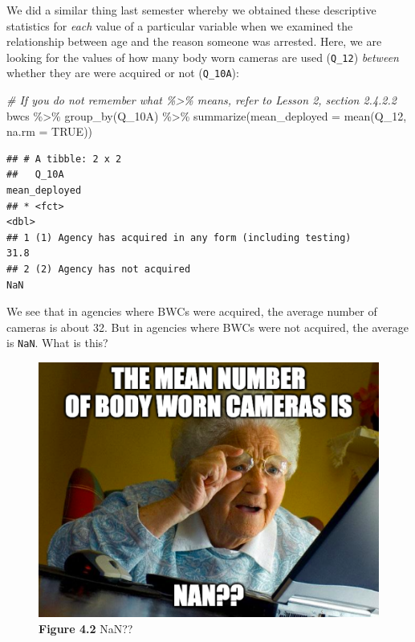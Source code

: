 \documentclass[
]{book}
\newenvironment{Shaded}{\begin{snugshade}}{\end{snugshade}}
\newcommand{\AttributeTok}[1]{\textcolor[rgb]{0.77,0.63,0.00}{#1}}
\newcommand{\CommentTok}[1]{\textcolor[rgb]{0.56,0.35,0.01}{\textit{#1}}}
\newcommand{\ConstantTok}[1]{\textcolor[rgb]{0.00,0.00,0.00}{#1}}
\newcommand{\FunctionTok}[1]{\textcolor[rgb]{0.00,0.00,0.00}{#1}}
\newcommand{\NormalTok}[1]{#1}
\newcommand{\SpecialCharTok}[1]{\textcolor[rgb]{0.00,0.00,0.00}{#1}}
\begin{document}
We did a similar thing last semester whereby we obtained these descriptive statistics for \emph{each} value of a particular variable when we examined the relationship between age and the reason someone was arrested. Here, we are looking for the values of how many body worn cameras are used (\texttt{Q\_12}) \emph{between} whether they are were acquired or not (\texttt{Q\_10A}):

\begin{Shaded}
\begin{Highlighting}[]
\CommentTok{\# If you do not remember what \textquotesingle{}\%\textgreater{}\%\textquotesingle{} means, refer to Lesson 2, section 2.4.2.2}
\NormalTok{bwcs }\SpecialCharTok{\%\textgreater{}\%} 
  \FunctionTok{group\_by}\NormalTok{(Q\_10A) }\SpecialCharTok{\%\textgreater{}\%} 
  \FunctionTok{summarize}\NormalTok{(}\AttributeTok{mean\_deployed =} \FunctionTok{mean}\NormalTok{(Q\_12, }\AttributeTok{na.rm =} \ConstantTok{TRUE}\NormalTok{))}
\end{Highlighting}
\end{Shaded}

\begin{verbatim}
## # A tibble: 2 x 2
##   Q_10A                                                   mean_deployed
## * <fct>                                                           <dbl>
## 1 (1) Agency has acquired in any form (including testing)          31.8
## 2 (2) Agency has not acquired                                     NaN
\end{verbatim}

We see that in agencies where BWCs were acquired, the average number of cameras is about 32. But in agencies where BWCs were not acquired, the average is \texttt{NaN}. What is this?

\begin{figure}
\centering
\includegraphics{Images/nan.png}
\caption{\textbf{Figure 4.2} NaN??}
\end{figure}
\end{document}
